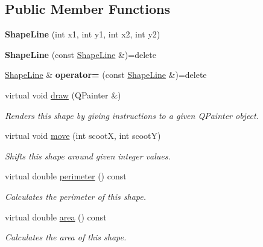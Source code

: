 \subsection*{Public Member Functions}
\begin{DoxyCompactItemize}
\item 
\mbox{\label{class_shape_line_a64e5a4ebb948b249de5bd26ec09cbb43}} 
{\bfseries Shape\+Line} (int x1, int y1, int x2, int y2)
\item 
\mbox{\label{class_shape_line_a4acb4bc45f72c1c812fc1eb46ff1fec5}} 
{\bfseries Shape\+Line} (const \mbox{\hyperlink{class_shape_line}{Shape\+Line}} \&)=delete
\item 
\mbox{\label{class_shape_line_a4c9674af8f603496953ba824ba70dfc7}} 
\mbox{\hyperlink{class_shape_line}{Shape\+Line}} \& {\bfseries operator=} (const \mbox{\hyperlink{class_shape_line}{Shape\+Line}} \&)=delete
\item 
virtual void \mbox{\hyperlink{class_shape_line_a8b4dbfe05387934a0f9c4a053a798239}{draw}} (Q\+Painter \&)
\begin{DoxyCompactList}\small\item\em Renders this shape by giving instructions to a given Q\+Painter object. \end{DoxyCompactList}\item 
virtual void \mbox{\hyperlink{class_shape_line_a5b6d9bcf7ed64ab2454d5efa66486ee9}{move}} (int scootX, int scootY)
\begin{DoxyCompactList}\small\item\em Shifts this shape around given integer values. \end{DoxyCompactList}\item 
virtual double \mbox{\hyperlink{class_shape_line_a68b22013926993e9bd9c2d146519a5af}{perimeter}} () const
\begin{DoxyCompactList}\small\item\em Calculates the perimeter of this shape. \end{DoxyCompactList}\item 
virtual double \mbox{\hyperlink{class_shape_line_a6f33bdd78706ad73e570b4ba53bbc00b}{area}} () const
\begin{DoxyCompactList}\small\item\em Calculates the area of this shape. \end{DoxyCompactList}\end{DoxyCompactItemize}
